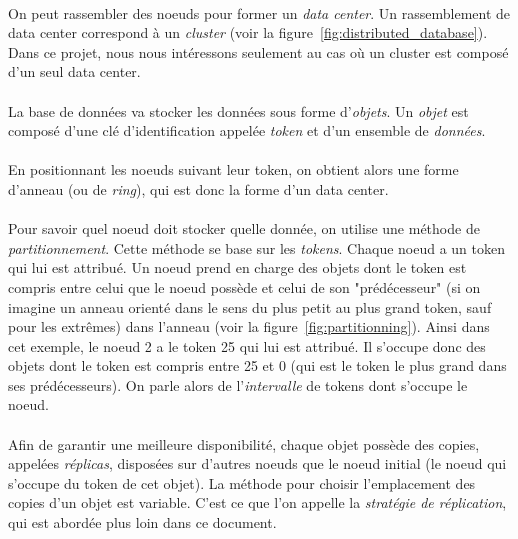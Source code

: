 \documentclass[12pt]{article}
\begin{document}
\paragraph{} On peut rassembler des noeuds pour former un \textit{data center}. Un rassemblement de data center correspond à un \textit{cluster} (voir la figure~\ref{fig:distributed_database}). Dans ce projet, nous nous intéressons seulement au cas où un cluster est composé d'un seul data center.

\paragraph{} La base de données va stocker les données sous forme d'\textit{objets}. Un \textit{objet} est composé d'une clé d'identification appelée \textit{token} et d'un ensemble de \textit{données}.

\paragraph{} En positionnant les noeuds suivant leur token, on obtient alors une forme d'anneau (ou de \textit{ring}), qui est donc la forme d'un data center.

\paragraph{} Pour savoir quel noeud doit stocker quelle donnée, on utilise une méthode de \textit{partitionnement}. Cette méthode se base sur les \textit{tokens}. Chaque noeud a un token qui lui est attribué. Un noeud prend en charge des objets dont le token est compris entre celui que le noeud possède et celui de son "prédécesseur" (si on imagine un anneau orienté dans le sens du plus petit au plus grand token, sauf pour les extrêmes) dans l'anneau (voir la figure~\ref{fig:partitionning}). Ainsi dans cet exemple, le noeud 2 a le token 25 qui lui est attribué. Il s'occupe donc des objets dont le token est compris entre 25 et 0 (qui est le token le plus grand dans ses prédécesseurs). On parle alors de l'\textit{intervalle} de tokens dont s'occupe le noeud.

\paragraph{} Afin de garantir une meilleure disponibilité, chaque objet possède des copies, appelées \textit{réplicas}, disposées sur d'autres noeuds que le noeud initial (le noeud qui s'occupe du token de cet objet). La méthode pour choisir l'emplacement des copies d'un objet est variable. C'est ce que l'on appelle la \textit{stratégie de réplication}, qui est abordée plus loin dans ce document.
\end{document}
